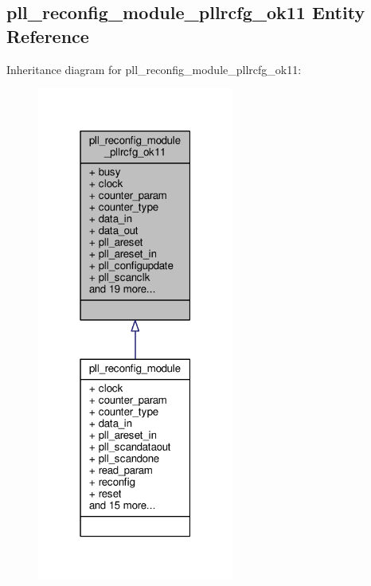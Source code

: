 \subsection{pll\+\_\+reconfig\+\_\+module\+\_\+pllrcfg\+\_\+ok11 Entity Reference}
\label{classpll__reconfig__module__pllrcfg__ok11}


Inheritance diagram for pll\+\_\+reconfig\+\_\+module\+\_\+pllrcfg\+\_\+ok11\+:\nopagebreak
\begin{figure}[H]
\begin{center}
\leavevmode
\includegraphics[width=183pt]{d5/de9/classpll__reconfig__module__pllrcfg__ok11__inherit__graph}
\end{center}
\end{figure}


